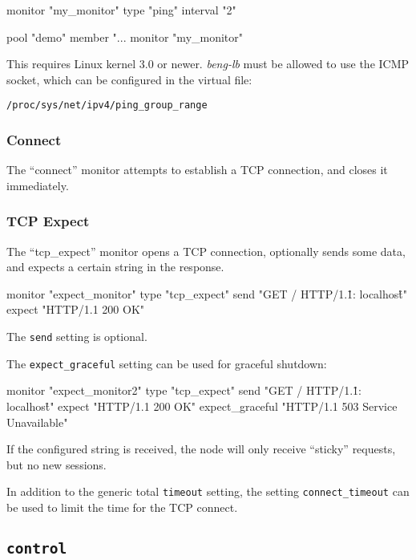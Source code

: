 \documentclass[a4paper,12pt]{article}
\begin{document}
\begin{verbatim*}
monitor "my_monitor" {
  type "ping"
  interval "2"
}

pool "demo" {
  member "...
  monitor "my_monitor"
}
\end{verbatim*}

This requires Linux kernel 3.0 or newer.  \emph{beng-lb} must be
allowed to use the ICMP socket, which can be configured in the virtual
file:

\texttt{/proc/sys/net/ipv4/ping\_group\_range}

\subsubsection{Connect}

The ``connect'' monitor attempts to establish a TCP connection, and
closes it immediately.

\subsubsection{TCP Expect}

The ``tcp\_expect'' monitor opens a TCP connection, optionally sends
some data, and expects a certain string in the response.

\begin{verbatim*}
monitor "expect_monitor" {
  type "tcp_expect"
  send "GET / HTTP/1.1\r\nHost: localhost\r\n\r\n"
  expect "HTTP/1.1 200 OK"
}
\end{verbatim*}

The \texttt{send} setting is optional.

The \verb|expect_graceful| setting can be used for graceful shutdown:

\begin{verbatim*}
monitor "expect_monitor2" {
  type "tcp_expect"
  send "GET / HTTP/1.1\r\nHost: localhost\r\n\r\n"
  expect "HTTP/1.1 200 OK"
  expect_graceful "HTTP/1.1 503 Service Unavailable"
}
\end{verbatim*}

If the configured string is received, the node will only receive
``sticky'' requests, but no new sessions.

In addition to the generic total \verb|timeout| setting, the setting
\verb|connect_timeout| can be used to limit the time for the TCP
connect.


\subsection{\texttt{control}}
\label{config.control}
\end{document}
